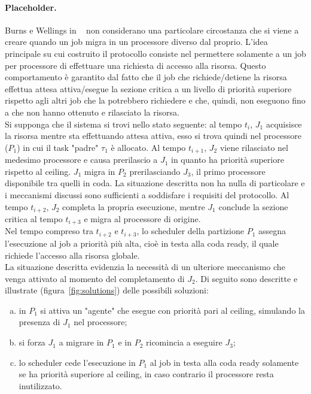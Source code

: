 \paragraph{Placeholder.} Burns e Wellings in ~\cite{Burns:2013:SCM:2547348.2547350} non considerano una particolare circostanza che si viene a creare quando un job migra in un processore diverso dal proprio. L'idea principale su cui costruito il protocollo consiste nel permettere solamente a un job per processore di effettuare una richiesta di accesso alla risorsa. Questo comportamento è garantito dal fatto che il job che richiede/detiene la risorsa effettua attesa attiva/esegue la sezione critica a un livello di priorità superiore rispetto agli altri job che la potrebbero richiedere e che, quindi, non eseguono fino a che non hanno ottenuto e rilasciato la risorsa.\\
Si supponga che il sistema si trovi nello stato seguente: al tempo $t_i$, $J_1$ acquisisce la risorsa mentre sta effettuando attesa attiva, esso si trova quindi nel processore ($P_1$) in cui il task "padre" $\tau_1$ è allocato. Al tempo $t_{i+1}$, $J_2$ viene rilasciato nel medesimo processore e causa prerilascio a $J_1$ in quanto ha priorità superiore rispetto al ceiling. $J_1$ migra in $P_2$ prerilasciando $J_3$, il primo processore disponibile tra quelli in coda. La situazione descritta non ha nulla di particolare e i meccanismi discussi sono sufficienti a soddisfare i requisiti del protocollo. Al tempo $t_{i+2}$, $J_2$ completa la propria esecuzione, mentre $J_1$ conclude la sezione critica al tempo $t_{i+3}$ e migra al processore di origine. \\
Nel tempo compreso tra $t_{i+2}$ e $t_{i+3}$, lo scheduler della partizione $P_1$ assegna l'esecuzione al job a priorità più alta, cioè in testa alla coda ready, il quale richiede l'accesso alla risorsa globale.\\

La situazione descritta evidenzia la necessità di un ulteriore meccanismo che venga attivato al momento del completamento di $J_2$. Di seguito sono descritte e illustrate (figura~\ref{fig:solutions}) delle possibili soluzioni:

\begin{enumerate}[a)]
\item in $P_1$ si attiva un "agente" che esegue con priorità pari al ceiling, simulando la presenza di $J_1$ nel processore;
\item si forza $J_1$ a migrare in $P_1$ e in $P_2$ ricomincia a eseguire $J_3$;
\item lo scheduler cede l'esecuzione in $P_1$ al job in testa alla coda ready solamente se ha priorità superiore al ceiling, in caso contrario il processore resta inutilizzato.
\end{enumerate}


